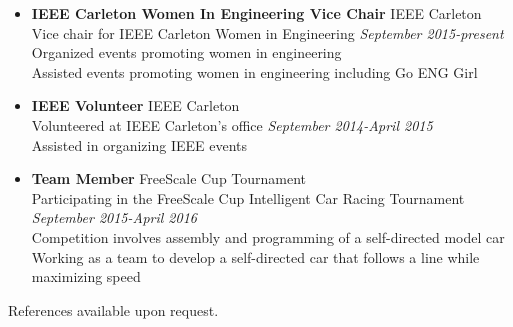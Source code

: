 \documentclass[letterpaper]{article}
\begin{document}
\begin{itemize}
\item \textbf{IEEE Carleton Women In Engineering Vice Chair} \hfill  IEEE Carleton\\
\textrm{Vice chair for IEEE Carleton Women in Engineering} \hfill \emph{September 2015-present} \\
\textrm{Organized events promoting women in engineering}\\
\textrm{Assisted events promoting women in engineering including Go ENG Girl}
\item \textbf{IEEE Volunteer} \hfill IEEE Carleton\\
\textrm{Volunteered at IEEE Carleton's office} \hfill \emph{September 2014-April 2015}\\
\textrm{Assisted in organizing IEEE events}
\item \textbf{Team Member} \hfill FreeScale Cup Tournament\\
\textrm{Participating in the FreeScale Cup Intelligent Car Racing Tournament} \hfill \emph{September 2015-April 2016}\\
\textrm{Competition involves assembly and programming of a self-directed model car}\\
\textrm{Working as a team to develop a self-directed car that follows a line while maximizing speed}
\end{itemize}

\begin{center}
References available upon request.
\end{center}
\end{document}
